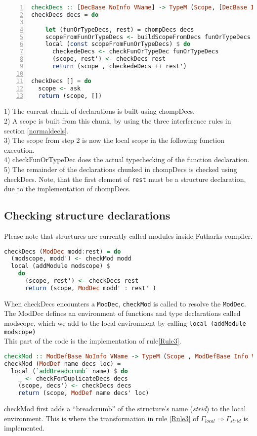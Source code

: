 \begin{lstlisting}[language=Haskell, numbers=left]
checkDecs :: [DecBase NoInfo VName] -> TypeM (Scope, [DecBase Info VName])
checkDecs decs = do

    let (funOrTypeDecs, rest) = chompDecs decs
    scopeFromFunOrTypeDecs <- buildScopeFromDecs funOrTypeDecs
    local (const scopeFromFunOrTypeDecs) $ do
      checkedeDecs <- checkFunOrTypeDec funOrTypeDecs
      (scope, rest') <- checkDecs rest
      return (scope , checkedeDecs ++ rest')

checkDecs [] = do
  scope <- ask
  return (scope, [])

\end{lstlisting}
1) The current chunk of declarations is built using chompDecs. \\
2) A scope is built from this chunk, by using the three interference rules in
section \ref{normaldecls}.\\
3) The scope from step 2 is now the local scope in the following function
execution.\\
4) checkFunOrTypeDec does the actual typechecking of the function declaration. \\
5) The remainder of the declarations chunked in chompDecs is checked using
checkDecs. Note, that the first element of \texttt{rest} must be a structure
declaration, due to the implementation of chompDecs.

\subsection{Checking structure declarations}
Please note that structures are currently called modules inside Futharks compiler.
\begin{lstlisting}[language=Haskell]
checkDecs (ModDec modd:rest) = do
  (modscope, modd') <- checkMod modd
  local (addModule modscope) $
    do
      (scope, rest') <- checkDecs rest
      return (scope, ModDec modd' : rest' )
\end{lstlisting}
When checkDecs encounters a \texttt{ModDec}, \texttt{checkMod} is called to resolve the \texttt{ModDec}.
The ModDec defines an environment of functions and type declarations called
modscope, which we add to the local environment by calling \texttt{local
  (addModule modscope)}\\
This part of the code is the implementation of rule\ref{Rule3}.

\begin{lstlisting}[language=Haskell]
checkMod :: ModDefBase NoInfo VName -> TypeM (Scope , ModDefBase Info VName)
checkMod (ModDef name decs loc) =
  local (`addBreadcrumb` name) $ do
    _ <- checkForDuplicateDecs decs
    (scope, decs') <- checkDecs decs
    return (scope, ModDef name decs' loc)
\end{lstlisting}
checkMod first adds a ``breadcrumb'' of the structure's name (\textit{strid}) to
the local environment. This is where the transformation in rule \ref{Rule3} of
$\Gamma_{local} \Rightarrow \Gamma_{strid}$ is implemented.

